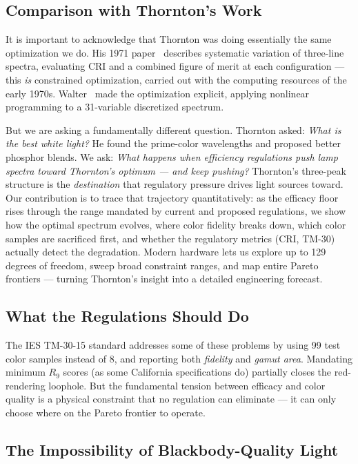 \documentclass[11pt]{article}
\begin{document}
\subsection{Comparison with Thornton's Work}

It is important to acknowledge that Thornton was doing essentially the same
optimization we do.  His 1971 paper~\cite{thornton1971} describes
systematic variation of three-line spectra, evaluating CRI and a combined
figure of merit at each configuration --- this \emph{is} constrained
optimization, carried out with the computing resources of the early 1970s.
Walter~\cite{walter1978} made the optimization explicit, applying nonlinear
programming to a 31-variable discretized spectrum.

But we are asking a fundamentally different question.  Thornton asked:
\emph{What is the best white light?}  He found the prime-color wavelengths
and proposed better phosphor blends.  We ask: \emph{What happens when
efficiency regulations push lamp spectra toward Thornton's optimum ---
and keep pushing?}  Thornton's three-peak structure is the \emph{destination}
that regulatory pressure drives light sources toward.  Our contribution is
to trace that trajectory quantitatively: as the efficacy floor rises through
the range mandated by current and proposed regulations, we show how the
optimal spectrum evolves, where color fidelity breaks down, which color
samples are sacrificed first, and whether the regulatory metrics (CRI, TM-30)
actually detect the degradation.  Modern hardware lets us explore up to 129
degrees of freedom, sweep broad constraint ranges, and map entire Pareto
frontiers --- turning Thornton's insight into a detailed engineering forecast.

\subsection{What the Regulations Should Do}

The IES TM-30-15 standard addresses some of these problems by using 99 test
color samples instead of 8, and reporting both \emph{fidelity} and
\emph{gamut area}.  Mandating minimum $R_9$ scores (as some California
specifications do) partially closes the red-rendering loophole.  But the
fundamental tension between efficacy and color quality is a physical
constraint that no regulation can eliminate --- it can only choose where
on the Pareto frontier to operate.

\subsection{The Impossibility of Blackbody-Quality Light}
\label{sec:impossibility}
\end{document}
